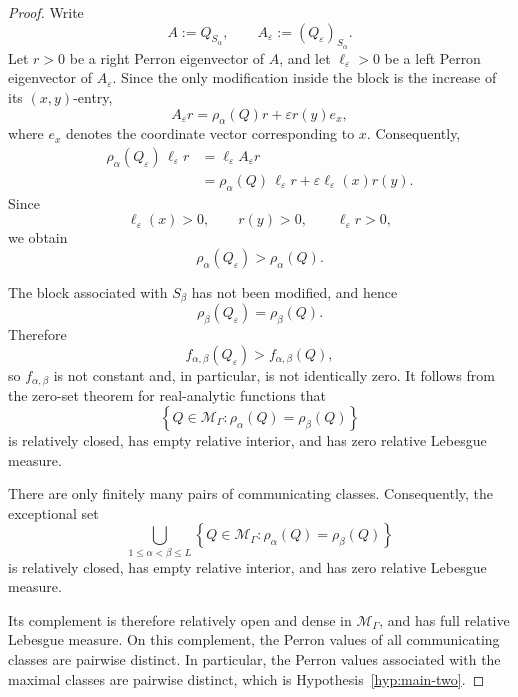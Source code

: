 \documentclass[10pt,letterpaper]{article}
\theoremstyle{compactplain}
\theoremstyle{compactdefinition}
\newcommand{\1}{\mathds{1}}
\begin{document}
\begin{proof}
Write
\[
A:=Q_{S_\alpha},
\qquad
A_\varepsilon:=(Q_\varepsilon)_{S_\alpha}.
\]
Let \(r>0\) be a right Perron eigenvector of \(A\), and let
\(\ell_\varepsilon>0\) be a left Perron eigenvector of
\(A_\varepsilon\). Since the only modification inside the block is the
increase of its \((x,y)\)-entry,
\[
A_\varepsilon r
=
\rho_\alpha(Q)r+\varepsilon r(y)e_x,
\]
where \(e_x\) denotes the coordinate vector corresponding to \(x\).
Consequently,
\begin{align*}
\rho_\alpha(Q_\varepsilon)\,\ell_\varepsilon r
&=
\ell_\varepsilon A_\varepsilon r\\
&=
\rho_\alpha(Q)\,\ell_\varepsilon r
+
\varepsilon\ell_\varepsilon(x)r(y).
\end{align*}
Since
\[
\ell_\varepsilon(x)>0,
\qquad
r(y)>0,
\qquad
\ell_\varepsilon r>0,
\]
we obtain
\[
\rho_\alpha(Q_\varepsilon)>\rho_\alpha(Q).
\]

The block associated with \(S_\beta\) has not been modified, and hence
\[
\rho_\beta(Q_\varepsilon)=\rho_\beta(Q).
\]
Therefore
\[
f_{\alpha,\beta}(Q_\varepsilon)
>
f_{\alpha,\beta}(Q),
\]
so \(f_{\alpha,\beta}\) is not constant and, in particular, is not
identically zero. It follows from the zero-set theorem for real-analytic functions that
\[
\left\{
Q\in\mathcal M_\Gamma:
\rho_\alpha(Q)=\rho_\beta(Q)
\right\}
\]
is relatively closed, has empty relative interior, and has zero relative
Lebesgue measure.

There are only finitely many pairs of communicating classes. Consequently,
the exceptional set
\[
\bigcup_{1\leq\alpha<\beta\leq L}
\left\{
Q\in\mathcal M_\Gamma:
\rho_\alpha(Q)=\rho_\beta(Q)
\right\}
\]
is relatively closed, has empty relative interior, and has zero relative
Lebesgue measure.

Its complement is therefore relatively open and dense in
\(\mathcal M_\Gamma\), and has full relative Lebesgue measure. On this
complement, the Perron values of all communicating classes are pairwise
distinct. In particular, the Perron values associated with the maximal
classes are pairwise distinct, which is
Hypothesis~\ref{hyp:main-two}.
\end{proof}





\end{document}
